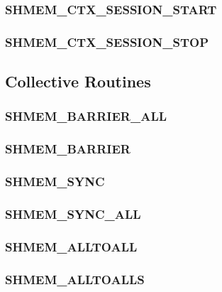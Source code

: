 \documentclass[10pt,oneside]{book}
\begin{document}
\subsubsection{\textbf{SHMEM\_CTX\_SESSION\_START}}\label{subsec:shmem_ctx_session_start}


\subsubsection{\textbf{SHMEM\_CTX\_SESSION\_STOP}}\label{subsec:shmem_ctx_session_stop}



\subsection{Collective Routines}\label{subsec:coll}


\subsubsection{\textbf{SHMEM\_BARRIER\_ALL}}\label{subsec:shmem_barrier_all}


\subsubsection{\textbf{SHMEM\_BARRIER}}\label{subsec:shmem_barrier}


\subsubsection{\textbf{SHMEM\_SYNC}}\label{subsec:shmem_sync}


\subsubsection{\textbf{SHMEM\_SYNC\_ALL}}\label{subsec:shmem_sync_all}


\subsubsection{\textbf{SHMEM\_ALLTOALL}}\label{subsec:shmem_alltoall}


\subsubsection{\textbf{SHMEM\_ALLTOALLS}}\label{subsec:shmem_alltoalls}

\end{document}
